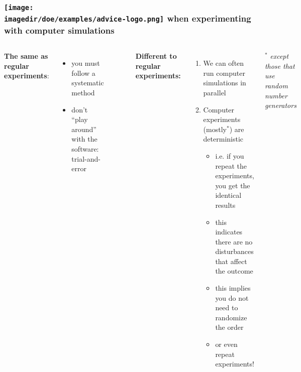 \begin{frame}\frametitle{\texttt{[image: \\imagedir/doe/examples/advice-logo.png]} when experimenting with computer simulations}
	\begin{columns}[T]
		
			\textbf{The same as regular experiments}:
			
			\vspace{12pt}
			\begin{itemize}
				\item	you must follow a systematic method
				\item	don't ``play around'' with the software: trial-and-error
			\end{itemize}
			
			\begin{center}\rule[8mm]{4cm}{0.01cm}\end{center}
			\rule[3mm]{0.01cm}{25mm}%
			
			\textbf{Different to regular experiments:}
			\vspace{12pt}
			\begin{enumerate}
				\item	We can often run computer simulations in parallel
				\item	Computer experiments (mostly$^\ast$) are deterministic
					\begin{itemize}
						\item	i.e. if you repeat the experiments, you get the identical results
						\item	this indicates there are no disturbances that affect the outcome
						\item	this implies you do not need to randomize the order
						\item	or even repeat experiments!
						
					\end{itemize}
			\end{enumerate}
			{\scriptsize $^\ast$ {\emph{except those that use random number generators}}}
	\end{columns}
	
	\vspace{-90pt}

\end{frame}

